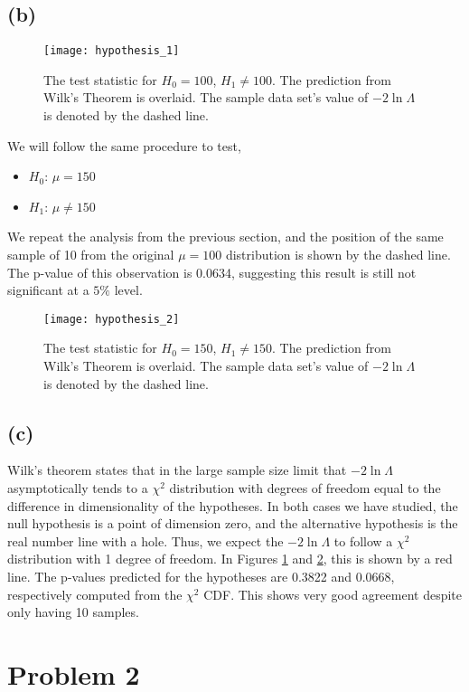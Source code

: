 \documentclass[12pt]{article}
\begin{document}
\subsection*{(b)}
\begin{figure}
\texttt{[image: hypothesis\_1]} \caption{The test statistic for $H_0 = 100$, $H_1 \neq 100$.  The prediction from Wilk's Theorem is overlaid. The sample data set's value of $-2 \ln \Lambda$ is denoted by the dashed line.} \label{fig:hypothesis_1}
\end{figure}
We will follow the same procedure to test,
\begin{itemize}
\item $H_0$: $\mu = 150$
\item $H_1$: $\mu \neq 150$
\end{itemize}
We repeat the analysis from the previous section, and the position of the same sample of 10 from the original $\mu=100$ distribution is shown by the dashed line.  The p-value of this observation is 0.0634, suggesting this result is still not significant at a $5\%$ level.
\begin{figure}
\texttt{[image: hypothesis\_2]}\caption{The test statistic for $H_0 = 150$, $H_1 \neq 150$.  The prediction from Wilk's Theorem is overlaid. The sample data set's value of $-2 \ln \Lambda$ is denoted by the dashed line.} \label{fig:hypothesis_2}
\end{figure}

\subsection*{(c)}
Wilk's theorem states that in the large sample size limit that $-2 \ln \Lambda$ asymptotically tends to a $\chi^2$ distribution with degrees of freedom equal to the difference in dimensionality of the hypotheses.   In both cases we have studied, the null hypothesis is a point of dimension zero, and the alternative hypothesis is the real number line with a hole.  Thus, we expect the $-2 \ln \Lambda$ to follow a $\chi^2$ distribution with 1 degree of freedom.  In Figures \ref{fig:hypothesis_1} and \ref{fig:hypothesis_2}, this is shown by a red line.  The p-values predicted for the hypotheses are 0.3822 and 0.0668, respectively computed from the $\chi^2$ CDF.  This shows very good agreement despite only having 10 samples.
\section*{Problem 2}
\end{document}
